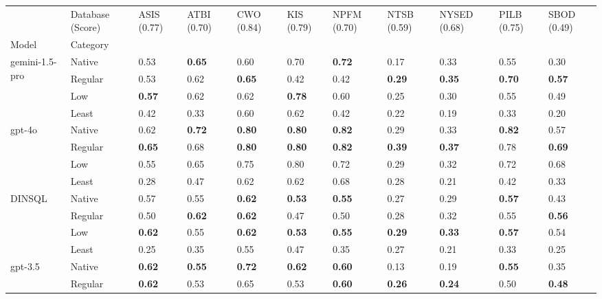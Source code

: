 \begin{tabular}{p{.9in}p{.5in}p{.3in}p{.3in}p{.3in}p{.3in}p{.3in}p{.3in}p{.3in}p{.3in}p{.3in}}
\toprule
 & Database (Score) & ASIS (0.77) & ATBI (0.70) & CWO (0.84) & KIS (0.79) & NPFM (0.70) & NTSB (0.59) & NYSED (0.68) & PILB (0.75) & SBOD (0.49) \\
Model & Category &  &  &  &  &  &  &  &  &  \\
\midrule
\multirow[t]{4}{*}{gemini-1.5-pro} & Native & 0.53 & \textbf{0.65} & 0.60 & 0.70 & \textbf{0.72} & 0.17 & 0.33 & 0.55 & 0.30 \\
 & Regular & 0.53 & 0.62 & \textbf{0.65} & 0.42 & 0.42 & \textbf{0.29} & \textbf{0.35} & \textbf{0.70} & \textbf{0.57} \\
 & Low & \textbf{0.57} & 0.62 & 0.62 & \textbf{0.78} & 0.60 & 0.25 & 0.30 & 0.55 & 0.49 \\
 & Least & 0.42 & 0.33 & 0.60 & 0.62 & 0.42 & 0.22 & 0.19 & 0.33 & 0.20 \\
\cline{1-11}
\multirow[t]{4}{*}{gpt-4o} & Native & 0.62 & \textbf{0.72} & \textbf{0.80} & \textbf{0.80} & \textbf{0.82} & 0.29 & 0.33 & \textbf{0.82} & 0.57 \\
 & Regular & \textbf{0.65} & 0.68 & \textbf{0.80} & \textbf{0.80} & \textbf{0.82} & \textbf{0.39} & \textbf{0.37} & 0.78 & \textbf{0.69} \\
 & Low & 0.55 & 0.65 & 0.75 & 0.80 & 0.72 & 0.29 & 0.32 & 0.72 & 0.68 \\
 & Least & 0.28 & 0.47 & 0.62 & 0.62 & 0.68 & 0.28 & 0.21 & 0.42 & 0.33 \\
\cline{1-11}
\multirow[t]{4}{*}{DINSQL} & Native & 0.57 & 0.55 & \textbf{0.62} & \textbf{0.53} & \textbf{0.55} & 0.27 & 0.29 & \textbf{0.57} & 0.43 \\
 & Regular & 0.50 & \textbf{0.62} & \textbf{0.62} & 0.47 & 0.50 & 0.28 & 0.32 & 0.55 & \textbf{0.56} \\
 & Low & \textbf{0.62} & 0.55 & \textbf{0.62} & \textbf{0.53} & \textbf{0.55} & \textbf{0.29} & \textbf{0.33} & \textbf{0.57} & 0.54 \\
 & Least & 0.25 & 0.35 & 0.55 & 0.47 & 0.35 & 0.27 & 0.21 & 0.33 & 0.25 \\
\cline{1-11}
\multirow[t]{4}{*}{gpt-3.5} & Native & \textbf{0.62} & \textbf{0.55} & \textbf{0.72} & \textbf{0.62} & \textbf{0.60} & 0.13 & 0.19 & \textbf{0.55} & 0.35 \\
 & Regular & \textbf{0.62} & 0.53 & 0.65 & 0.53 & \textbf{0.60} & \textbf{0.26} & \textbf{0.24} & 0.50 & \textbf{0.48} \\

\end{tabular}
